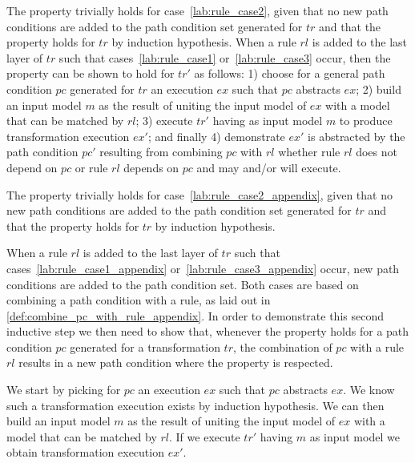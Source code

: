 \begin{ps}
\begin{itemize}
The property trivially holds for case~\ref{lab:rule_case2}, given that no new path conditions are added to the path condition set generated for $tr$ and that the property holds for $tr$ by induction hypothesis. When a rule $rl$ is added to the last layer of $tr$ such that cases~\ref{lab:rule_case1} or~\ref{lab:rule_case3} occur, then the property can be shown to hold for $tr'$ as follows: 1) choose for a general path condition $pc$ generated for $tr$ an execution $ex$ such that $pc$ abstracts $ex$; 2) build an input model $m$ as the result of uniting the input model of $ex$ with a model that can be matched by $rl$; 3) execute $tr'$ having as input model $m$ to produce transformation execution $ex'$; and finally 4) demonstrate $ex'$ is abstracted by the path condition $pc'$ resulting from combining $pc$ with $rl$ whether rule $rl$ does not depend on $pc$ or rule $rl$ depends on $pc$ and may and/or will execute.

The property trivially holds for case~\ref{lab:rule_case2_appendix}, given that no new path conditions are added to the path condition set generated for $tr$ and that the property holds for $tr$ by induction hypothesis.

When a rule $rl$ is added to the last layer of $tr$ such that cases~\ref{lab:rule_case1_appendix} or~\ref{lab:rule_case3_appendix} occur, new path conditions are added to the path condition set. Both cases are based on combining a path condition with a rule, as laid out in \cref{def:combine_pc_with_rule_appendix}. In order to demonstrate this second inductive step we then need to show that, whenever the property holds for a path condition $pc$ generated for a transformation $tr$, the combination of $pc$ with a rule $rl$ results in a new path condition where the property is respected.

We start by picking for $pc$ an execution $ex$ such that $pc$ abstracts $ex$. We know such a transformation execution exists by induction hypothesis. We can then build an input model $m$ as the result of uniting the input model of $ex$ with a model that can be matched by $rl$. If we execute $tr'$ having $m$ as input model we obtain transformation execution $ex'$.


\end{itemize}
\end{ps}
